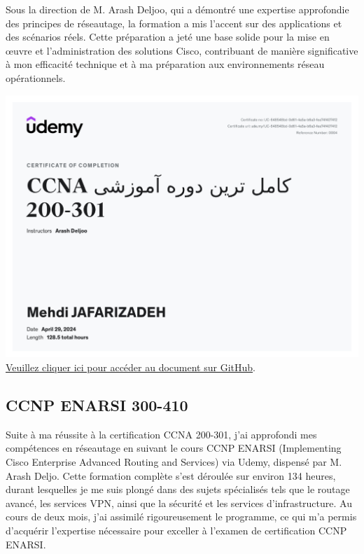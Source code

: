 \documentclass{article}
\begin{document}
    Sous la direction de M. Arash Deljoo, qui a démontré une expertise approfondie des principes de réseautage, la formation a mis l'accent sur des applications et des scénarios réels. Cette préparation a jeté une base solide pour la mise en œuvre et l'administration des solutions Cisco, contribuant de manière significative à mon efficacité technique et à ma préparation aux environnements réseau opérationnels.
    \newline
    \newline
    
        \begin{center}
            \includegraphics[width=\textwidth,height=\textheight,keepaspectratio]{../Document/Certificats de Fin de Cours/CCNA 200-301/CCNA 200-301.pdf}
            \footnotesize
             \href{https://github.com/jafarizadeh/CV---lettre/tree/a64fa195620766a9cf39fd42a2fd963779d13f6f/Document/Course%20Completion%20Certificates/CCNA%20200-301}{Veuillez cliquer ici pour accéder au document sur GitHub}.
        \end{center}

    \newpage
    
    \subsection{CCNP ENARSI 300-410}
    \par
    Suite à ma réussite à la certification CCNA 200-301, j'ai approfondi mes compétences en réseautage en suivant le cours CCNP ENARSI (Implementing Cisco Enterprise Advanced Routing and Services) via Udemy, dispensé par M. Arash Deljo. Cette formation complète s'est déroulée sur environ 134 heures, durant lesquelles je me suis plongé dans des sujets spécialisés tels que le routage avancé, les services VPN, ainsi que la sécurité et les services d'infrastructure. Au cours de deux mois, j'ai assimilé rigoureusement le programme, ce qui m'a permis d'acquérir l'expertise nécessaire pour exceller à l'examen de certification CCNP ENARSI.
    \newline
    \newline
\end{document}
